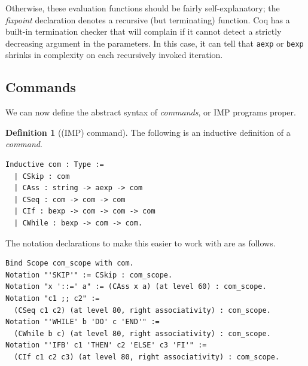 \documentclass[12pt,notitlepage]{report}
\theoremstyle{plain}
\theoremstyle{definition}
\newtheorem{defin}[theo]{Definition}
\newtheorem{example}[theo]{Example}
\newcommand{\define}[1]{\emph{#1}\index{#1}}
\numberwithin{equation}{section}
\begin{document}
Otherwise, these evaluation functions should be fairly self-explanatory; the \define{fixpoint} declaration denotes a recursive (but terminating) function.  Coq has a built-in termination checker that will complain if it cannot detect a strictly decreasing argument in the parameters.  In this case, it can tell that \texttt{aexp} or \texttt{bexp} shrinks in complexity on each recursively invoked iteration.

\subsection{Commands}
We can now define the abstract syntax of \define{commands}, or IMP programs proper.

\begin{defin}[(IMP) command]\label{impcommand}
    The following is an inductive definition of a \emph{command}.
    \begin{verbatim}
Inductive com : Type :=
  | CSkip : com
  | CAss : string -> aexp -> com
  | CSeq : com -> com -> com
  | CIf : bexp -> com -> com -> com
  | CWhile : bexp -> com -> com.
    \end{verbatim}
    The notation declarations to make this easier to work with are as follows.
\begin{verbatim}
Bind Scope com_scope with com.
Notation "'SKIP'" := CSkip : com_scope.
Notation "x '::=' a" := (CAss x a) (at level 60) : com_scope.
Notation "c1 ;; c2" :=
  (CSeq c1 c2) (at level 80, right associativity) : com_scope.
Notation "'WHILE' b 'DO' c 'END'" :=
  (CWhile b c) (at level 80, right associativity) : com_scope.
Notation "'IFB' c1 'THEN' c2 'ELSE' c3 'FI'" :=
  (CIf c1 c2 c3) (at level 80, right associativity) : com_scope.
\end{verbatim}
\end{defin}

\end{document}
